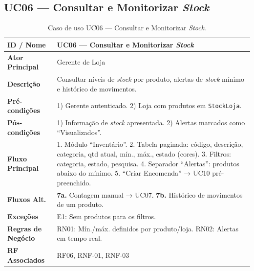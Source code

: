 \documentclass[a4paper,12pt]{scrreprt}
\begin{document}
\subsection*{UC06 --- Consultar e Monitorizar \textit{Stock}}
\begin{table}[H]
\centering\small
\begin{tabular}{|p{3cm}|p{11cm}|}
\hline
\textbf{ID / Nome} & UC06 --- Consultar e Monitorizar \textit{Stock} \\
\hline
\textbf{Ator Principal} & Gerente de Loja \\
\hline
\textbf{Descrição} & Consultar níveis de \textit{stock} por produto, alertas de \textit{stock} mínimo e histórico de movimentos. \\
\hline
\textbf{Pré-condições} & 1) Gerente autenticado. 2) Loja com produtos em \texttt{StockLoja}. \\
\hline
\textbf{Pós-condições} & 1) Informação de \textit{stock} apresentada. 2) Alertas marcados como ``Visualizados''. \\
\hline
\textbf{Fluxo Principal} & 1. Módulo ``Inventário''. 2. Tabela paginada: código, descrição, categoria, qtd atual, mín., máx., estado (cores). 3. Filtros: categoria, estado, pesquisa. 4. Separador ``Alertas'': produtos abaixo do mínimo. 5. ``Criar Encomenda'' → UC10 pré-preenchido. \\
\hline
\textbf{Fluxos Alt.} & \textbf{7a.} Contagem manual → UC07. \textbf{7b.} Histórico de movimentos de um produto. \\
\hline
\textbf{Exceções} & E1: Sem produtos para os filtros. \\
\hline
\textbf{Regras de Negócio} & RN01: Mín./máx. definidos por produto/loja. RN02: Alertas em tempo real. \\
\hline
\textbf{RF Associados} & RF06, RNF-01, RNF-03 \\
\hline
\end{tabular}
\caption{Caso de uso UC06 --- Consultar e Monitorizar \textit{Stock}.}
\end{table}

\end{document}
